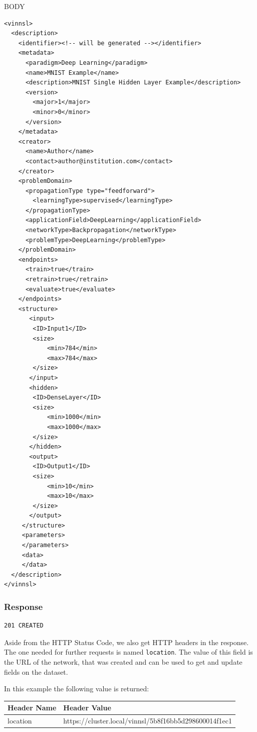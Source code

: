 BODY

\begin{verbatim}
<vinnsl>
  <description>
    <identifier><!-- will be generated --></identifier>
    <metadata>
      <paradigm>Deep Learning</paradigm>
      <name>MNIST Example</name>
      <description>MNIST Single Hidden Layer Example</description>
      <version>
        <major>1</major>
        <minor>0</minor>
      </version>
    </metadata>
    <creator>
      <name>Author</name>
      <contact>author@institution.com</contact>
    </creator>
    <problemDomain>
      <propagationType type="feedforward">
        <learningType>supervised</learningType>
      </propagationType>
      <applicationField>DeepLearning</applicationField>
      <networkType>Backpropagation</networkType>
      <problemType>DeepLearning</problemType>
    </problemDomain>
    <endpoints>
      <train>true</train>
      <retrain>true</retrain>
      <evaluate>true</evaluate>
    </endpoints>
    <structure>
       <input>
        <ID>Input1</ID>
        <size>
            <min>784</min>
            <max>784</max>
        </size>
       </input>
       <hidden>
        <ID>DenseLayer</ID>
        <size>
            <min>1000</min>
            <max>1000</max>
        </size>
       </hidden>
       <output>
        <ID>Output1</ID>
        <size>
            <min>10</min>
            <max>10</max>
        </size>
       </output>
     </structure>
     <parameters>
     </parameters>
     <data>
     </data>
  </description>
</vinnsl>
\end{verbatim}

\subsubsection{Response}\label{response-6}

\begin{verbatim}
201 CREATED 
\end{verbatim}

Aside from the HTTP Status Code, we also get HTTP headers in the
response. The one needed for further requests is named
\texttt{location}. The value of this field is the URL of the network,
that was created and can be used to get and update fields on the
dataset.

In this example the following value is returned:

\begin{longtable}[]{@{}ll@{}}
\toprule
Header Name & Header Value\tabularnewline
\midrule
\endhead
location &
https://cluster.local/vinnsl/5b8f16bb5d298600014f1ec1\tabularnewline
\bottomrule
\end{longtable}

